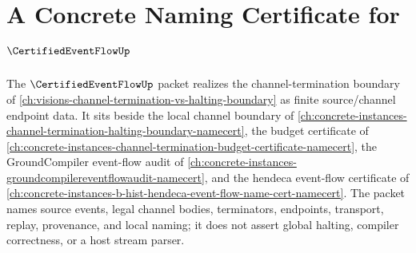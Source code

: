 \chapter{A Concrete Naming Certificate for $\CertifiedEventFlowUp$}
\label{ch:concrete-instances-certified-event-flow-namecert}

The $\CertifiedEventFlowUp$ packet realizes the channel-termination boundary of \autoref{ch:visions-channel-termination-vs-halting-boundary} as finite source/channel endpoint data. It sits beside the local channel boundary of \autoref{ch:concrete-instances-channel-termination-halting-boundary-namecert}, the budget certificate of \autoref{ch:concrete-instances-channel-termination-budget-certificate-namecert}, the GroundCompiler event-flow audit of \autoref{ch:concrete-instances-groundcompilereventflowaudit-namecert}, and the hendeca event-flow certificate of \autoref{ch:concrete-instances-b-hist-hendeca-event-flow-name-cert-namecert}. The packet names source events, legal channel bodies, terminators, endpoints, transport, replay, provenance, and local naming; it does not assert global halting, compiler correctness, or a host stream parser.

